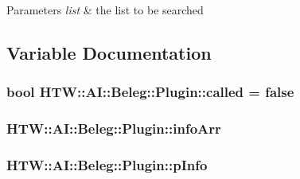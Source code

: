 \begin{DoxyParams}{Parameters}
{\em list} & the list to be searched \\
\hline
\end{DoxyParams}


\subsection{Variable Documentation}
\hypertarget{namespace_h_t_w_1_1_a_i_1_1_beleg_1_1_plugin_af4caea43df274d3c07b7995b1b75cea0}{
\subsubsection[{called}]{\setlength{\rightskip}{0pt plus 5cm}bool H\-T\-W\-::\-A\-I\-::\-Beleg\-::\-Plugin\-::called = false}}\label{namespace_h_t_w_1_1_a_i_1_1_beleg_1_1_plugin_af4caea43df274d3c07b7995b1b75cea0}
\hypertarget{namespace_h_t_w_1_1_a_i_1_1_beleg_1_1_plugin_a7dc1c25d83285520a29dbb1fed5a37c2}{
\subsubsection[{info\-Arr}]{ H\-T\-W\-::\-A\-I\-::\-Beleg\-::\-Plugin\-::info\-Arr}}\label{namespace_h_t_w_1_1_a_i_1_1_beleg_1_1_plugin_a7dc1c25d83285520a29dbb1fed5a37c2}
\hypertarget{namespace_h_t_w_1_1_a_i_1_1_beleg_1_1_plugin_a853f5a9bf6edef9b228b84cff3c71dc5}{
\subsubsection[{p\-Info}]{ H\-T\-W\-::\-A\-I\-::\-Beleg\-::\-Plugin\-::p\-Info}}\label{namespace_h_t_w_1_1_a_i_1_1_beleg_1_1_plugin_a853f5a9bf6edef9b228b84cff3c71dc5}
